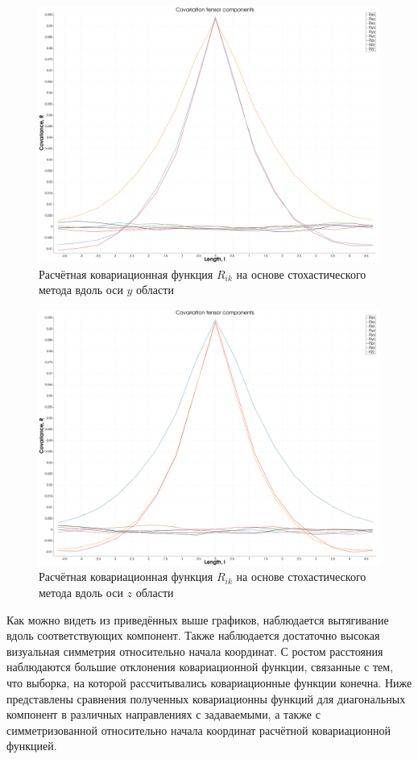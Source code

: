 \begin{figure}[ht] 
  \center
  \includegraphics [width=0.8\linewidth] {images/kriging/3components/calculated_all_y.png}
  \caption{Расчётная ковариационная функция $R_{ik}$ на основе стохастического метода вдоль оси $y$ области } 
  \label{img:kriging_covariances_y}  
\end{figure}

\begin{figure}[ht] 
  \center
  \includegraphics [width=0.8\linewidth] {images/kriging/3components/calculated_all_z.png}
  \caption{Расчётная ковариационная функция $R_{ik}$ на основе стохастического метода вдоль оси $z$ области } 
  \label{img:kriging_covariances_y}  
\end{figure}

Как можно видеть из приведённых выше графиков, наблюдается вытягивание вдоль соответствующих компонент. Также наблюдается достаточно высокая визуальная симметрия относительно начала координат. С ростом расстояния наблюдаются большие отклонения ковариационной функции, связанные с тем, что выборка, на которой рассчитывались ковариационные функции конечна. Ниже представлены сравнения полученных ковариационны функций для диагональных компонент в различных направлениях с задаваемыми, а также с симметризованной относительно начала координат расчётной ковариационной функцией.

